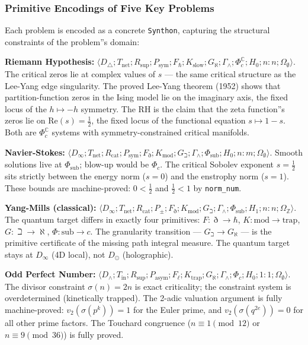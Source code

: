 \documentclass[12pt,a4paper]{article}
\begin{document}
\subsubsection{Primitive Encodings of Five Key Problems}

Each problem is encoded as a concrete \texttt{Synthon}, capturing the structural constraints of the problem''s domain:

\textbf{Riemann Hypothesis:} $\langle D_{\triangle}; T_\text{net}; R_\text{sup}; P_\text{sym}; F_{\hbar}; K_\text{slow}; G_{\aleph}; \Gamma_{\wedge}; \Phi_c^\mathbb{C}; H_0; n{:}n; \Omega_{\emptyset} \rangle$. The critical zeros lie at complex values of $s$ --- the same critical structure as the Lee-Yang edge singularity. The proved Lee-Yang theorem (1952) shows that partition-function zeros in the Ising model lie on the imaginary axis, the fixed locus of the $h \mapsto -h$ symmetry. The RH is the claim that the zeta function''s zeros lie on $\text{Re}(s) = \frac{1}{2}$, the fixed locus of the functional equation $s \mapsto 1-s$. Both are $\Phi_c^\mathbb{C}$ systems with symmetry-constrained critical manifolds.

\textbf{Navier-Stokes:} $\langle D_{\infty}; T_\text{net}; R_\text{cat}; P_\text{sym}; F_{\eth}; K_\text{mod}; G_{\beth}; \Gamma_{\wedge}; \Phi_\text{sub}; H_0; n{:}m; \Omega_{\emptyset} \rangle$. Smooth solutions live at $\Phi_\text{sub}$; blow-up would be $\Phi_c$. The critical Sobolev exponent $s = \frac{1}{2}$ sits strictly between the energy norm ($s = 0$) and the enstrophy norm ($s = 1$). These bounds are machine-proved: $0 < \frac{1}{2}$ and $\frac{1}{2} < 1$ by \texttt{norm\_num}.

\textbf{Yang-Mills (classical):} $\langle D_{\infty}; T_\text{net}; R_\text{cat}; P_{\pm}; F_{\eth}; K_\text{mod}; G_{\beth}; \Gamma_{\wedge}; \Phi_\text{sub}; H_1; n{:}n; \Omega_\mathbb{Z} \rangle$. The quantum target differs in exactly four primitives: $F: \eth \to \hbar$, $K: \text{mod} \to \text{trap}$, $G: \beth \to \aleph$, $\Phi: \text{sub} \to c$. The granularity transition --- $G_{\beth} \to G_{\aleph}$ --- is the primitive certificate of the missing path integral measure. The quantum target stays at $D_{\infty}$ (4D local), not $D_{\odot}$ (holographic).

\textbf{Odd Perfect Number:} $\langle D_{\wedge}; T_\text{in}; R_\text{sup}; P_\text{asym}; F_{\ell}; K_\text{trap}; G_{\aleph}; \Gamma_{\wedge}; \Phi_c; H_0; 1{:}1; \Omega_{\emptyset} \rangle$. The divisor constraint $\sigma(n) = 2n$ is exact criticality; the constraint system is overdetermined (kinetically trapped). The 2-adic valuation argument is fully machine-proved: $v_2(\sigma(p^k)) = 1$ for the Euler prime, and $v_2(\sigma(q^{2e})) = 0$ for all other prime factors. The Touchard congruence ($n \equiv 1 \pmod{12}$ or $n \equiv 9 \pmod{36}$) is fully proved.
\end{document}
